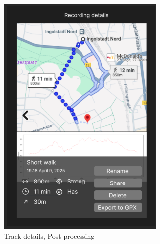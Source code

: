 \documentclass[12pt]{article}
\begin{document}
\begin{figure}[h!]
    \centering
    \includegraphics[width=\textwidth]{Project_Screenshots/recordingdata.png}
    \caption{Track details, Post-processing}
\end{figure}

\clearpage
\newpage
\end{document}
